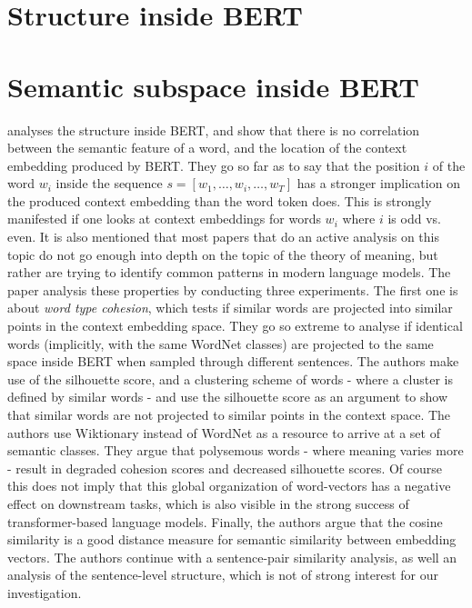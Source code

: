 \documentclass[a4paper,12pt,twoside,openright]{report}
\begin{document}
\section{Structure inside BERT}

\section{Semantic subspace inside BERT}

\cite{mickus19} analyses the structure inside BERT, and show that there is no correlation between the semantic feature of a word, and the location of the context embedding produced by BERT.
They go so far as to say that the position $i$ of the word $w_i$ inside the sequence $s = [w_1, \ldots, w_i, \ldots, w_T]$ has a stronger implication on the produced context embedding than the word token does.
This is strongly manifested if one looks at context embeddings for words $w_i$ where $i$ is odd vs. even.
It is also mentioned that most papers that do an active analysis on this topic do not go enough into depth on the topic of the theory of meaning, but rather are trying to identify common patterns in modern language models.
The paper analysis these properties by conducting three experiments.
The first one is about \textit{word type cohesion}, which tests if similar words are projected into similar points in the context embedding space.
They go so extreme to analyse if identical words (implicitly, with the same WordNet classes) are projected to the same space inside BERT when sampled through different sentences.
The authors make use of the silhouette score, and a clustering  scheme of words - where a cluster is defined by similar words - and use the silhouette score as an argument to show that similar words are not projected to similar points in the context space.
The authors use Wiktionary
instead of WordNet as a resource to arrive at a set of semantic classes.
They argue that polysemous words - where meaning varies more - result in degraded cohesion scores and decreased silhouette scores.
Of course this does not imply that this global organization of word-vectors has a negative effect on downstream tasks, which is also visible in the strong success of transformer-based language models.
Finally, the authors argue that the cosine similarity is a good distance measure for semantic similarity between embedding vectors.
The authors continue with a sentence-pair similarity analysis, as well an analysis of the sentence-level structure, which is not of strong interest for our investigation. \\
\end{document}
